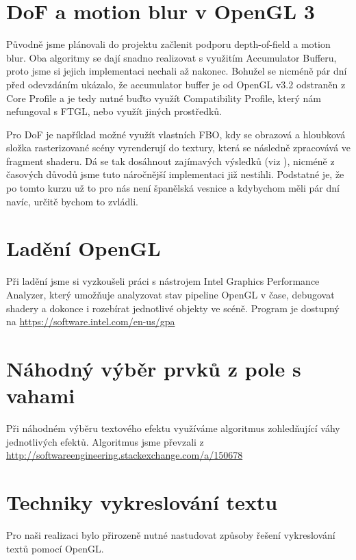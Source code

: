 \documentclass[12pt,a4paper,titlepage,final]{report}
\begin{document}
\section{DoF a motion blur v OpenGL 3}

Původně jsme plánovali do projektu začlenit podporu depth-of-field a motion blur. Oba algoritmy se dají snadno realizovat s využitím Accumulator Bufferu, proto jsme si jejich implementaci nechali až nakonec. Bohužel se nicméně pár dní před odevzdáním ukázalo, že accumulator buffer je od OpenGL v3.2 odstraněn z Core Profile \cite{opengl} a je tedy nutné buďto využít Compatibility Profile, který nám nefungoval s FTGL, nebo využít jiných prostředků.

Pro DoF je například možné využít vlastních FBO, kdy se obrazová a hloubková složka rasterizované scény vyrenderují do textury, která se následně zpracovává ve fragment shaderu. Dá se tak dosáhnout zajímavých výsledků (viz \cite{blog:dof}), nicméně z časových důvodů jsme tuto náročnější implementaci již nestihli. Podstatné je, že po tomto kurzu už to pro nás není španělská vesnice a kdybychom měli pár dní navíc, určitě bychom to zvládli.

\section{Ladění OpenGL}

Při ladění jsme si vyzkoušeli práci s nástrojem Intel Graphics Performance Analyzer, který umožňuje analyzovat stav pipeline OpenGL v čase, debugovat shadery a dokonce i rozebírat jednotlivé objekty ve scéně. Program je dostupný na \url{https://software.intel.com/en-us/gpa}

\section{Náhodný výběr prvků z pole s vahami}

Při náhodném výběru textového efektu využíváme algoritmus zohledňující váhy jednotlivých efektů. Algoritmus jsme převzali z \url{http://softwareengineering.stackexchange.com/a/150678}

\section{Techniky vykreslování textu}

Pro naši realizaci bylo přirozeně nutné nastudovat způsoby řešení vykreslování textů pomocí OpenGL.
\end{document}

